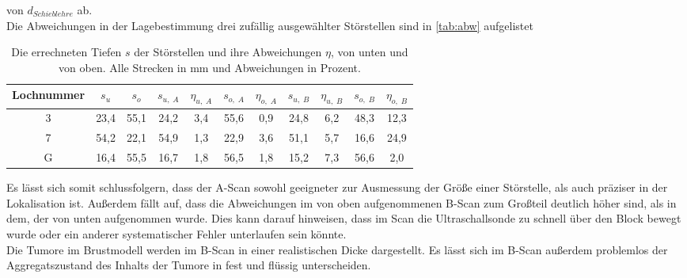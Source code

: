von $d_{Schieblehre}$ ab.\\
Die Abweichungen in der Lagebestimmung drei zufällig ausgewählter Störstellen sind in \autoref{tab:abw} aufgelistet
\begin{table}[H]
    \centering
    \caption{Die errechneten Tiefen $s$ der Störstellen und ihre Abweichungen $\eta$, von unten und von oben. Alle Strecken in mm und Abweichungen in Prozent.}
    \begin{tabular}{ccccccccccc}
      \toprule
      {Lochnummer} & 
      {$s_{u}$} &
      {$s_{o}$} &
      {$s_{u, \; A}$} &
      {$\eta_{u, \; A}$} &
      {$s_{o, \; A}$} &      
      {$\eta_{o, \; A}$} &
      {$s_{u, \; B}$} &
      {$\eta_{u, \; B}$} &
      {$s_{o, \; B}$} &      
      {$\eta_{o, \; B}$} \\
      \midrule
      3  &  23,4  & 55,1  &  24,2   &  3,4  & 55,6  &  0,9  &  24,8 &  6,2   &  48,3 &  12,3  \\
      7  &  54,2  & 22,1  &  54,9   &  1,3  & 22,9  &  3,6  &  51,1 &  5,7   &  16,6 &  24,9  \\
      G  &  16,4  & 55,5  &  16,7   &  1,8  & 56,5  &  1,8  &  15,2 &  7,3   &  56,6 &   2,0  \\
      \bottomrule
    \end{tabular}
 \label{tab:abw}
\end{table}
\noindent
Es lässt sich somit schlussfolgern, dass der A-Scan sowohl geeigneter zur Ausmessung der Größe einer Störstelle, als auch 
präziser in der Lokalisation ist. 
Außerdem fällt auf, dass die Abweichungen im von oben aufgenommenen B-Scan zum Großteil deutlich höher sind, als in dem, der von unten aufgenommen wurde.
Dies kann darauf hinweisen, dass im Scan die Ultraschallsonde zu schnell über den Block bewegt wurde oder ein anderer systematischer 
Fehler unterlaufen sein könnte.\\ 

Die Tumore im Brustmodell werden im B-Scan in einer realistischen Dicke dargestellt.
Es lässt sich im B-Scan außerdem problemlos der Aggregatszustand des Inhalts der Tumore in fest und flüssig unterscheiden. 
